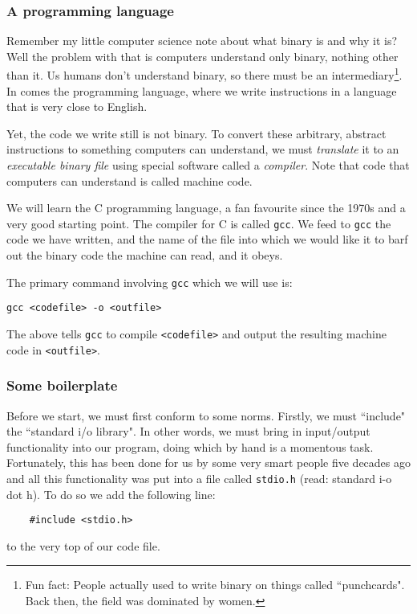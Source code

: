 \documentclass{article}
\newcommand{\gcc}{\Verb|gcc|}
\begin{document}
\subsubsection*{A programming language}
Remember my little computer science note about what binary is and why it is? Well the problem with
that is computers understand only binary, nothing other than it. Us humans don't understand binary,
so there must be an intermediary\footnote{Fun fact: People actually used to write binary on things
called ``punchcards". Back then, the field was dominated by women.}. In comes the programming 
language, where we write instructions in a language that is very close to English.

Yet, the code we write still is not binary. To convert these arbitrary, abstract instructions to
something computers can understand, we must \textit{translate} it to an \textit{executable binary
file} using special software called a \textit{compiler}. Note that code that computers can 
understand is called machine code.

We will learn the C programming language, a fan favourite since the 1970s and a very good starting
point. The compiler for C is called \gcc{}. We feed to \gcc{} the code we have written, and the name
of the file into which we would like it to barf out the binary code the machine can read, and it
obeys.

The primary command involving \gcc{} which we will use is:

\begin{center}
\verb|gcc <codefile> -o <outfile>| 
\end{center}
The above tells \gcc{} to compile \verb|<codefile>| and output
the resulting machine code in \verb|<outfile>|.

\subsubsection*{Some boilerplate}
Before we start, we must first conform to some norms. Firstly, we must ``include" the ``standard
i/o library". In other words, we must bring in input/output functionality into our program, doing
which by hand is a momentous task. Fortunately, this has been done for us by some very smart people
five decades ago and all this functionality was put into a file called \verb|stdio.h| (read: 
standard i-o dot h). To do so we add the following line:

\begin{center}
	\begin{BVerbatim}
	#include <stdio.h>
	\end{BVerbatim}
\end{center}
to the very top of our code file.
\end{document}
